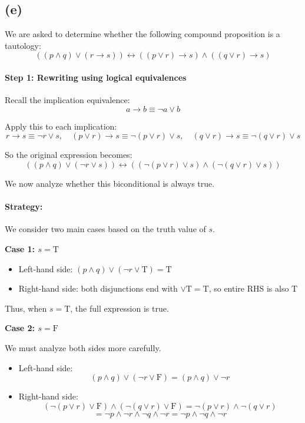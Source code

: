 \documentclass{article}
\begin{document}
\subsection*{(e)}

We are asked to determine whether the following compound proposition is a tautology:
\[
((p \land q) \lor (r \to s)) \leftrightarrow ((p \lor r) \to s) \land ((q \lor r) \to s)
\]

\paragraph{Step 1: Rewriting using logical equivalences}

Recall the implication equivalence:
\[
a \to b \equiv \neg a \lor b
\]

Apply this to each implication:
\[
r \to s \equiv \neg r \lor s,\quad (p \lor r) \to s \equiv \neg(p \lor r) \lor s,\quad (q \lor r) \to s \equiv \neg(q \lor r) \lor s
\]

So the original expression becomes:
\[
((p \land q) \lor (\neg r \lor s)) \leftrightarrow ((\neg(p \lor r) \lor s) \land (\neg(q \lor r) \lor s))
\]

We now analyze whether this biconditional is always true.

\paragraph{Strategy:}

We consider two main cases based on the truth value of \( s \).

\medskip
\textbf{Case 1: \( s = \text{T} \)}

\begin{itemize}
  \item Left-hand side: \( (p \land q) \lor (\neg r \lor \text{T}) = \text{T} \)
  \item Right-hand side: both disjunctions end with \( \lor \text{T} = \text{T} \), so entire RHS is also \( \text{T} \)
\end{itemize}

Thus, when \( s = \text{T} \), the full expression is true.

\medskip
\textbf{Case 2: \( s = \text{F} \)}

We must analyze both sides more carefully.

\begin{itemize}
  \item Left-hand side: 
  \[
  (p \land q) \lor (\neg r \lor \text{F}) = (p \land q) \lor \neg r
  \]

  \item Right-hand side:
  \[
  (\neg(p \lor r) \lor \text{F}) \land (\neg(q \lor r) \lor \text{F}) = \neg(p \lor r) \land \neg(q \lor r)
  \]
  \[
  = \neg p \land \neg r \land \neg q \land \neg r = \neg p \land \neg q \land \neg r
  \]
\end{itemize}
\end{document}
